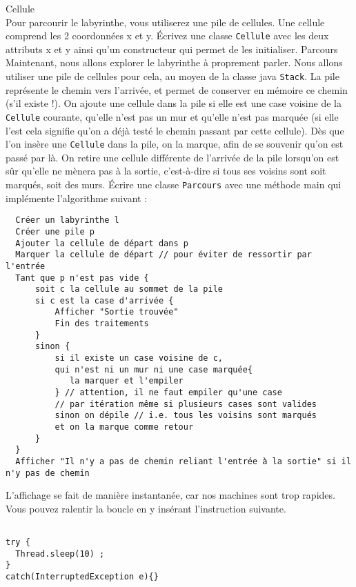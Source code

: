 \documentclass[iutinfo,a4paper,nocorrections,10pt]{ustl-tdtp}
\begin{document}
\question Cellule \\
Pour parcourir le labyrinthe, vous utiliserez une pile de
cellules. Une cellule comprend les 2 coordonnées x et y.
Écrivez une classe \texttt{Cellule} avec les deux attributs x et y ainsi qu'un constructeur qui permet de les initialiser.
\question Parcours \\
Maintenant, nous allons explorer le labyrinthe à proprement parler. Nous allons utiliser une pile de cellules pour cela, au moyen de la classe java \texttt{Stack}. La pile représente le chemin vers l'arrivée, et permet de conserver en mémoire ce chemin
(s'il existe !). On ajoute une cellule dans la pile si elle est une case voisine de la \texttt{Cellule} courante, qu'elle n'est pas un mur et qu'elle n’est pas marquée
(si elle l’est cela signifie qu’on a déjà testé le chemin passant par cette cellule). Dès que l'on
insère une \texttt{Cellule} dans la pile, on la marque, afin de se souvenir qu'on est passé par là. On retire une cellule différente de l'arrivée de la pile lorsqu'on est sûr qu'elle ne mènera pas à la sortie, c'est-à-dire si tous ses voisins sont soit marqués,
soit des murs.
Écrire une classe \texttt{Parcours} avec une méthode main qui implémente l'algorithme suivant :
\begin{verbatim}
  Créer un labyrinthe l
  Créer une pile p
  Ajouter la cellule de départ dans p
  Marquer la cellule de départ // pour éviter de ressortir par l'entrée
  Tant que p n'est pas vide {
      soit c la cellule au sommet de la pile  
      si c est la case d'arrivée {
          Afficher "Sortie trouvée"
          Fin des traitements
      }
      sinon {
          si il existe un case voisine de c, 
          qui n'est ni un mur ni une case marquée{
             la marquer et l'empiler 
          } // attention, il ne faut empiler qu'une case
          // par itération même si plusieurs cases sont valides
          sinon on dépile // i.e. tous les voisins sont marqués
          et on la marque comme retour
      }
  }
  Afficher "Il n'y a pas de chemin reliant l'entrée à la sortie" si il n'y pas de chemin

\end{verbatim}
L'affichage se fait de manière instantanée, car nos machines sont trop rapides. Vous pouvez ralentir la boucle en y insérant l'instruction suivante.
\begin{verbatim}

try {
  Thread.sleep(10) ;
}
catch(InterruptedException e){}
\end{verbatim}
\end{document}
